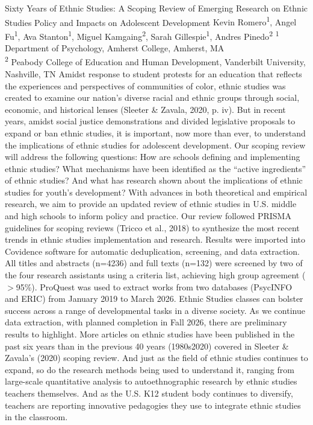 \makeabstract
    {
    Sixty Years of Ethnic Studies: A Scoping Review of Emerging Research on Ethnic Studies Policy and Impacts on Adolescent Development 
    }
    {
    Kevin Romero\textsuperscript{1}, Angel Fu\textsuperscript{1},  Ava Stanton\textsuperscript{1}, Miguel Kamgaing\textsuperscript{2}, Sarah Gillespie\textsuperscript{1}, Andres Pinedo\textsuperscript{2}
    }
    {
    \textsuperscript{1} Department of Psychology, Amherst College, Amherst, MA\\
\textsuperscript{2} Peabody College of Education and Human Development, Vanderbilt University, Nashville, TN
    }
    {
    Amidst response to student protests for an education that reflects the experiences and perspectives of communities of color, ethnic studies was created to examine our nation{\textquoteright}s diverse racial and ethnic groups through social, economic, and historical lenses (Sleeter \& Zavala, 2020, p. iv). But in recent years, amidst social justice demonstrations and divided legislative proposals to expand or ban ethnic studies, it is important, now more than ever, to understand the implications of ethnic studies for adolescent development. Our scoping review will address the following questions: How are schools defining and implementing ethnic studies? What mechanisms have been identified as the {\textquotedblleft}active ingredients{\textquotedblright} of ethnic studies? And what has research shown about the implications of ethnic studies for youth{\textquoteright}s development? With advances in both theoretical and empirical research, we aim to provide an updated review of ethnic studies in U.S. middle and high schools to inform policy and practice.
    }
    {
    Our review followed PRISMA guidelines for scoping reviews (Tricco et al., 2018) to synthesize the most recent trends in ethnic studies implementation and research. Results were imported into Covidence software for automatic deduplication, screening, and data extraction. All titles and abstracts (n=4236) and full texts (n=132) were screened by two of the four research assistants using a criteria list, achieving high group agreement (\ensuremath{>}95\%). ProQuest was used to extract works from two databases (PsycINFO and ERIC) from January 2019 to March 2026.
    }
    {
    Ethnic Studies classes can bolster success across a range of developmental tasks in a diverse society. As we continue data extraction, with planned completion in Fall 2026, there are preliminary results to highlight. More articles on ethnic studies have been published in the past six years than in the previous 40 years (1980s{\textendash}2020) covered in Sleeter \& Zavala{\textquoteright}s (2020) scoping review. And just as the field of ethnic studies continues to expand, so do the research methods being used to understand it, ranging from large-scale quantitative analysis to autoethnographic research by ethnic studies teachers themselves. And as the U.S. K{\textendash}12 student body continues to diversify, teachers are reporting innovative pedagogies they use to integrate ethnic studies in the classroom.
    }
